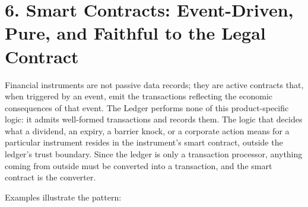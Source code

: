 \documentclass[11pt,a4paper]{article}
\newcommand{\clabel}[1]{\leavevmode\hypertarget{clause-#1}{}%
  \marginpar{\raggedright\scriptsize\ttfamily\textcolor{gray}{#1}}}
\begin{document}
\hypertarget{smart-contracts-event-driven-pure-and-faithful-to-the-legal-contract}{%
\section{6. Smart Contracts: Event-Driven, Pure, and Faithful to the
Legal
Contract}\label{smart-contracts-event-driven-pure-and-faithful-to-the-legal-contract}}

\clabel{C-6.1}Financial instruments are not passive data records; they are active
contracts that, when triggered by an event, emit the transactions
reflecting the economic consequences of that event. The Ledger performs
none of this product-specific logic: it admits well-formed transactions
and records them. The logic that decides what a dividend, an expiry, a
barrier knock, or a corporate action means for a particular instrument
resides in the instrument's smart contract, outside the ledger's trust
boundary. Since the ledger is only a transaction processor, anything
coming from outside must be converted into a transaction, and the smart
contract is the converter.

Examples illustrate the pattern:
\end{document}
